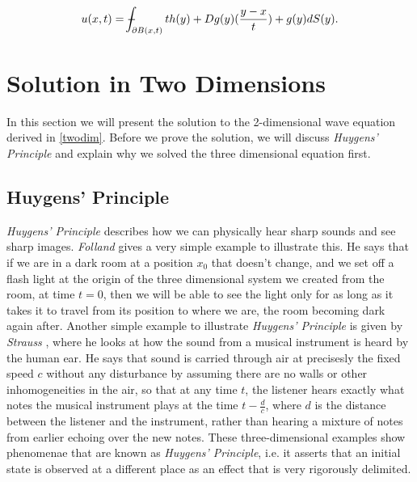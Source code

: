 \documentclass[a4paper, 12pt]{article}
\def\Xint#1{\mathchoice
{\XXint\displaystyle\textstyle{#1}}%
{\XXint\textstyle\scriptstyle{#1}}%
{\XXint\scriptstyle\scriptscriptstyle{#1}}%
{\XXint\scriptscriptstyle\scriptscriptstyle{#1}}%
\!\int}
\def\XXint#1#2#3{{\setbox0=\hbox{$#1{#2#3}{\int}$ }
\vcenter{\hbox{$#2#3$ }}\kern-.6\wd0}}
\def\dashint{\Xint-}
\numberwithin{equation}{section}
\begin{document}
\begin{equation*}
    u(x,t)=\dashint_{\partial B(x,t)}{th(y)+Dg(y)(\frac{y-x}{t})+g(y)dS(y)}.
\end{equation*}

\section{Solution in Two Dimensions}
In this section we will present the solution to the 2-dimensional wave equation derived in \ref{twodim}. Before we prove the solution, we will discuss \emph{Huygens' 
Principle} and explain why we solved the three dimensional equation first.

\subsection{Huygens' Principle}
\emph{Huygens' Principle} describes how we can physically hear sharp sounds and see sharp images. \emph{Folland} \cite{Fol} gives a very simple example to illustrate 
this. He says that if we are in a dark room at a position $x_0$ that doesn't change, and we set off a flash light at the origin of the three dimensional system we 
created from the room, at time $t=0$, then we will be able to see the light only for as long as it takes it to travel from its position to where we are, the room
becoming dark again after. Another simple example to illustrate \emph{Huygens' Principle} is given by \emph{Strauss} \cite{Str}, where he looks at how the sound
from a musical instrument is heard by the human ear. He says that sound is carried through air at precisesly the fixed speed $c$ without any disturbance by assuming
there are no walls or other inhomogeneities in the air, so that at any time $t$, the listener hears exactly what notes the musical instrument plays at the time $t-\frac{d}{c}$,
where $d$ is the distance between the listener and the instrument, rather than hearing a mixture of notes from earlier echoing over the new notes. These three-dimensional 
examples show phenomenae that are known as \emph{Huygens' Principle}, i.e. it asserts that an initial state is observed at a different place as an effect that is 
very rigorously delimited. \cite{Hil} 
\\
\end{document}

